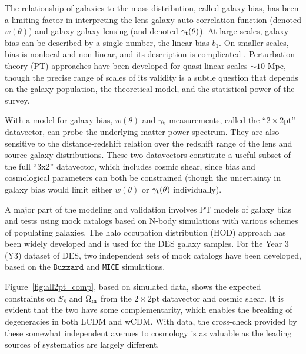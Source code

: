 \documentclass[fleqn,usenatbib]{mnras}
\newcommand{\mice}{\texttt{MICE} }
\newcommand{\buzzard}{\texttt{Buzzard} }
\begin{document}
The relationship of galaxies to the mass distribution, called galaxy bias, has been a limiting factor in interpreting the lens galaxy auto-correlation function (denoted $w(\theta)$) and galaxy-galaxy lensing (and denoted $\gamma_{\rm t}(\theta)$). At large scales, galaxy bias can be described by a single number, the linear bias $b_1$. On smaller scales, bias is nonlocal and non-linear, and its description is complicated \citep{Fry_93,Scherrer_98}. Perturbation theory (PT) approaches have been developed for quasi-linear scales $\sim 10$ Mpc, though the precise range of scales of its validity is a subtle question that depends on the galaxy population, the theoretical model, and the statistical power of the survey. 

With a model for galaxy bias, $w(\theta)$ and $\gamma_{\rm t}$ measurements, called the ``$2\times2$pt'' datavector, can probe the underlying matter power spectrum. They are also sensitive to the distance-redshift relation over the redshift range of the lens and source galaxy distributions.  These two datavectors constitute a useful subset of the full ``3x2'' datavector, which includes cosmic shear, since bias and cosmological parameters can both be constrained (though the uncertainty in galaxy bias would limit either $w(\theta)$ or $\gamma_{\rm t}(\theta)$ individually). 


A major part of the modeling and validation involves PT models of galaxy bias and tests using mock catalogs based on N-body simulations with various schemes of populating galaxies. The halo occupation distribution (HOD) approach has been widely developed and is used for the DES galaxy samples. For the Year 3 (Y3) dataset of DES, two independent sets of mock catalogs have been developed, based on the $\buzzard$ and \mice simulations. 


Figure~\ref{fig:all2pt_comp}, based on simulated data, shows the expected constraints on $S_8$ and $\Omega_{\rm m}$ from the $2\times2$pt datavector and cosmic shear. It is evident that the two have some complementarity, which enables the breaking of degeneracies in both LCDM and wCDM. With data, the cross-check provided by these somewhat independent avenues to cosmology is as valuable as the leading sources of systematics are largely different. 
\end{document}
